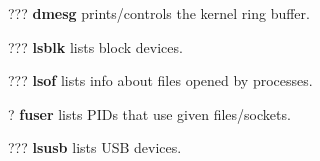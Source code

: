 \begin{compactenum}
\item [???] \textbf{dmesg} prints/controls the kernel ring buffer.
\item [???] \textbf{lsblk} lists block devices.
\item [???] \textbf{lsof} lists info about files opened by processes.
\item [?] \textbf{fuser} lists PIDs that use given files/sockets.
\item [???] \textbf{lsusb} lists USB devices.
\end{compactenum}